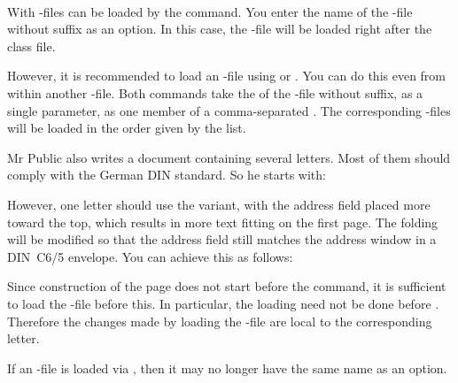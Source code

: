 \begin{Declaration}
  \\
\end{Declaration}
%
%
With  -files can be loaded by the
 command. You enter the name of the -file
without suffix as an option. In this case, the -file
will be loaded right after the class file.

However, it is recommended to load an -file using
 or
. You can do this
even from within another -file. Both commands take the 
of the -file without suffix,  as a single
parameter,  as one member of a comma-separated
. The corresponding -files will be loaded in
the order given by the list.
\begin{Example}
  Mr Public also writes a document containing several letters. Most of them
  should comply with the German DIN standard. So he starts with:
  However, one letter should use the  variant, with the
  address field placed more toward the top, which results in more text
  fitting on the first page. The folding will be modified so that the
  address field still matches the address window in a DIN~C6/5 envelope.
  You can achieve this as follows:
  Since construction of the page does not start before the
   command, it is sufficient to load the
  -file before this. In particular, the loading need not be done
  before . Therefore the changes made by
  loading the -file are local to the corresponding letter.
\end{Example}

If an -file is loaded via
, then it may no longer have the same name as an option.

